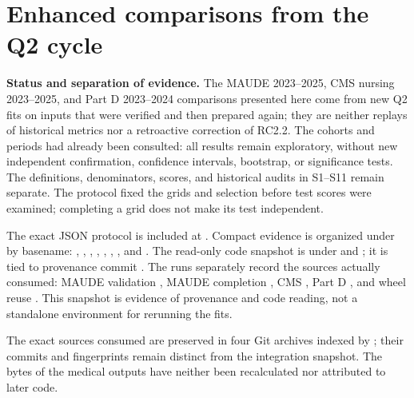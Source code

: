 \par{}
\section{Enhanced comparisons from the Q2 cycle}
\label{supp:q2-comparisons}

\textbf{Status and separation of evidence.} The MAUDE 2023--2025, CMS nursing 2023--2025, and Part D 2023--2024 comparisons presented here come from new Q2 fits on inputs that were verified and then prepared again; they are neither replays of historical metrics nor a retroactive correction of RC2.2. The cohorts and periods had already been consulted: all results remain exploratory, without new independent confirmation, confidence intervals, bootstrap, or significance tests. The definitions, denominators, scores, and historical audits in S1--S11 remain separate. The protocol fixed the grids and selection before test scores were examined; completing a grid does not make its test independent\cite{hgbq2methods,hgbcode}.

The exact JSON protocol is included at . Compact evidence is organized under  by basename: , , , , , , , and . The read-only code snapshot is under  and ; it is tied to provenance commit . The runs separately record the sources actually consumed: MAUDE validation , MAUDE completion , CMS , Part D , and wheel reuse . This snapshot is evidence of provenance and code reading, not a standalone environment for rerunning the fits.

The exact sources consumed are preserved in four Git archives indexed by ; their commits and fingerprints remain distinct from the integration snapshot. The bytes of the medical outputs have neither been recalculated nor attributed to later code.

